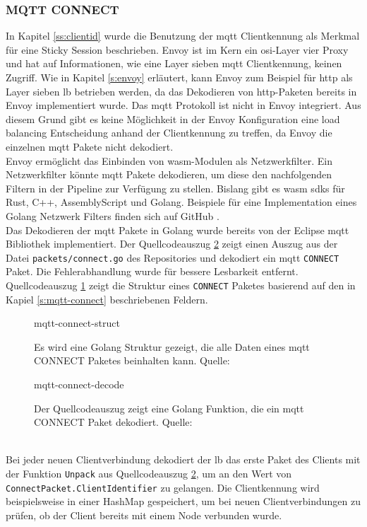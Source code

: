 \subsubsection{MQTT CONNECT}
In Kapitel \ref{ss:clientid} wurde die Benutzung der \ac{mqtt} Clientkennung als Merkmal für eine Sticky Session beschrieben. Envoy ist im Kern ein \ac{osi}-Layer vier Proxy und hat auf Informationen, wie eine Layer sieben \ac{mqtt} Clientkennung, keinen Zugriff. Wie in Kapitel \ref{s:envoy} erläutert, kann Envoy zum Beispiel für \ac{http} als Layer sieben \ac{lb} betrieben werden, da das Dekodieren von \ac{http}-Paketen bereits in Envoy implementiert wurde.
Das \ac{mqtt} Protokoll ist nicht in Envoy integriert. Aus diesem Grund gibt es keine Möglichkeit in der Envoy Konfiguration eine load balancing Entscheidung anhand der Clientkennung zu treffen, da Envoy die einzelnen \ac{mqtt} Pakete nicht dekodiert.
\\
Envoy ermöglicht das Einbinden von \acl{wasm}-Modulen als Netzwerkfilter.
Ein Netzwerkfilter könnte \ac{mqtt} Pakete dekodieren, um diese den nachfolgenden Filtern in der Pipeline zur Verfügung zu stellen.
Bislang gibt es \ac{wasm} \acp{sdk} für Rust, C++, AssemblyScript und Golang. \cite{sebastianHowWriteWASM} Beispiele für eine Implementation eines Golang Netzwerk Filters finden sich auf GitHub \cite{TetratelabsProxywasmgosdk2021}.
\\
Das Dekodieren der \ac{mqtt} Pakete in Golang wurde bereits von der Eclipse \ac{mqtt} Bibliothek \cite{EclipsePahoMqtt2021} implementiert.
Der Quellcodeauszug \ref{code:mqtt-connect-decode} zeigt einen Auszug aus der Datei \verb|packets/connect.go| des Repositories und dekodiert ein \ac{mqtt} \verb|CONNECT| Paket. Die Fehlerabhandlung wurde für bessere Lesbarkeit entfernt. Quellcodeauszug \ref{code:mqtt-connect-struct} zeigt die Struktur eines \verb|CONNECT| Paketes basierend auf den in Kapiel \ref{s:mqtt-connect} beschriebenen Feldern.
\begin{figure}[h]
    {mqtt-connect-struct}
    \caption{Es wird eine Golang Struktur gezeigt, die alle Daten eines \ac{mqtt} CONNECT Paketes beinhalten kann. Quelle: \cite{EclipsePahoMqtt2021}}
    \label{code:mqtt-connect-struct}
\end{figure}
\begin{figure}[h]
    {mqtt-connect-decode}
    \caption{Der Quellcodeauszug zeigt eine Golang Funktion, die ein \ac{mqtt} CONNECT Paket dekodiert. Quelle: \cite{EclipsePahoMqtt2021}}
    \label{code:mqtt-connect-decode}
\end{figure}
\\
Bei jeder neuen Clientverbindung dekodiert der \acl{lb} das erste Paket des Clients mit der Funktion \verb|Unpack| aus Quellcodeauszug \ref{code:mqtt-connect-decode}, um an den Wert von\newline
\verb|ConnectPacket.ClientIdentifier| zu gelangen.
Die Clientkennung wird beispielsweise in einer HashMap gespeichert, um bei neuen Clientverbindungen zu prüfen, ob der Client bereits mit einem Node verbunden wurde.

